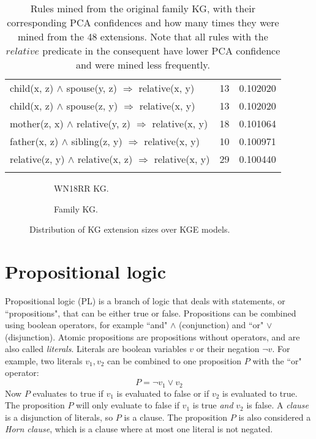 \begin{longtable}{lrr}
     child(x, z) $\wedge$ spouse(y, z)   $\Rightarrow$ relative(x, y) &           13 &        0.102020 \\
     child(x, z) $\wedge$ spouse(z, y)   $\Rightarrow$ relative(x, y) &           13 &        0.102020 \\
  mother(z, x) $\wedge$ relative(y, z)   $\Rightarrow$ relative(x, y) &           18 &        0.101064 \\
   father(x, z) $\wedge$ sibling(z, y)   $\Rightarrow$ relative(x, y) &           10 &        0.100971 \\
relative(z, y) $\wedge$ relative(x, z)   $\Rightarrow$ relative(x, y) &           29 &        0.100440 \\
\bottomrule
\caption[Rules mined from the original family KG]{Rules mined from the original family KG, with their corresponding PCA confidences and how many times they were mined from the 48 extensions. Note that all rules with the $relative$ predicate in the consequent have lower PCA confidence and were mined less frequently.}
\label{family_original_rules_table_PCA}
\end{longtable}


\begin{figure}[htb]
\centering
\begin{subfigure}{.5\textwidth}
  \centering
  
  \caption{WN18RR KG.}
  \label{fig:model_extension_wn18rr_boxplot_sub}
\end{subfigure}%
\begin{subfigure}{.5\textwidth}
  \centering
  
  \caption{Family KG.}
  \label{fig:model_extension_family_boxplot_sub}
\end{subfigure}
\caption{Distribution of KG extension sizes over KGE models.}
\label{model_extensions_boxplot}
\end{figure}

\chapter{Propositional logic}
\label{propositional_logic}
Propositional logic (PL) is a branch of logic that deals with statements, or ``propositions", that can be either true or false. Propositions can be combined using boolean operators, for example ``and" $\wedge$ (conjunction) and ``or" $\vee$ (disjunction). Atomic propositions are propositions without operators, and are also called \textit{literals}. Literals are boolean variables $v$ or their negation $\neg v$. For example, two literals $v_1, v_2$ can be combined to one proposition $P$ with the ``or" operator:
\[P = \neg v_1 \vee v_2\]
Now $P$ evaluates to true if $v_1$ is evaluated to false or if $v_2$ is evaluated to true. The proposition $P$ will only evaluate to false if $v_1$ is true \textit{and} $v_2$ is false. A \textit{clause} is a disjunction of literals, so $P$ is a clause. The proposition $P$ is also considered a \textit{Horn clause}, which is a clause where at most one literal is not negated. 

